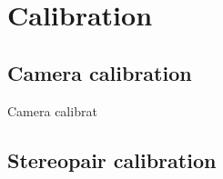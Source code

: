 \chapter{Calibration}
\label{chapter:calibration}

\section{Camera calibration}

Camera calibrat

\section{Stereopair calibration}

